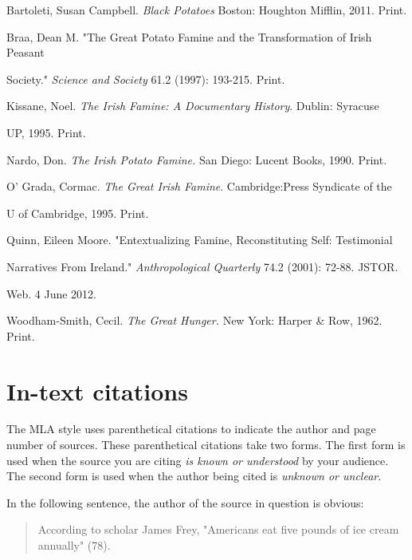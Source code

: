 \begin{Spacing}{1.5}
Bartoleti, Susan Campbell. \emph{Black Potatoes} Boston: Houghton Mifflin, 2011. Print.

Braa, Dean M. "The Great Potato Famine and the Transformation of Irish Peasant 

\hspace{.4in}Society." \emph{Science and Society} 61.2 (1997): 193-215. Print.

Kissane, Noel. \emph{The Irish Famine: A Documentary History}. Dublin: Syracuse 

\hspace{.4in}UP, 1995. Print.

Nardo, Don. \emph{The Irish Potato Famine.} San Diego: Lucent Books, 1990. Print.

O' Grada, Cormac. \emph{The Great Irish Famine}. Cambridge:Press Syndicate of the 

\hspace{.4in} U of Cambridge, 1995. Print.

Quinn, Eileen Moore. "Entextualizing Famine, Reconstituting Self: Testimonial 

\hspace{.4in}Narratives From Ireland." \emph{Anthropological Quarterly} 74.2 (2001): 72-88. JSTOR. 

\hspace{.4in}Web. 4 June 2012.

Woodham-Smith, Cecil.  \emph{The Great Hunger.} New York: Harper \& Row, 1962. Print.


\end{Spacing}

\newpage

\section{In-text citations}
The MLA style uses parenthetical citations to indicate the author and page number of 
sources. These parenthetical citations take two forms. The first form is used when the 
source you are citing \emph{is known or understood} by your audience. The second 
form is used when the author being cited is \emph{unknown or unclear}. 

In the following sentence, the author of the source in question is obvious:

\begin{quote}According to scholar James Frey, "Americans eat five pounds of ice cream 
annually" (78).
\end{quote}

